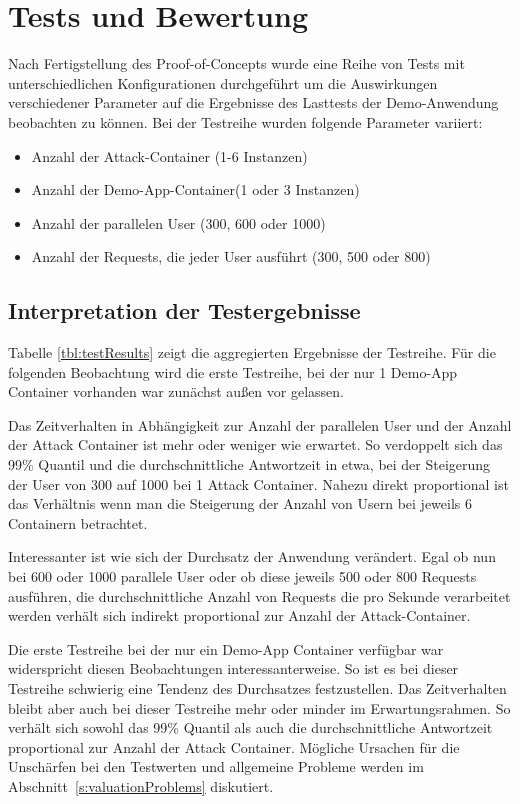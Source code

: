 \chapter{Tests und Bewertung}

Nach Fertigstellung des Proof-of-Concepts wurde eine Reihe von Tests mit unterschiedlichen Konfigurationen durchgef\"uhrt um die Auswirkungen verschiedener Parameter auf die Ergebnisse des Lasttests der Demo-Anwendung beobachten zu k\"onnen.
Bei der Testreihe wurden folgende Parameter variiert:

\begin{itemize}
	\item Anzahl der Attack-Container (1-6 Instanzen)
	\item Anzahl der Demo-App-Container(1 oder 3 Instanzen)
	\item Anzahl der parallelen User (300, 600 oder 1000)
	\item Anzahl der Requests, die jeder User ausf\"uhrt (300, 500 oder 800)
\end{itemize}

\section{Interpretation der Testergebnisse}
\label{s:valuationInterpretation}

Tabelle \ref{tbl:testResults} zeigt die aggregierten Ergebnisse der Testreihe.
F\"ur die folgenden Beobachtung wird die erste Testreihe, bei der nur 1 Demo-App Container vorhanden war zun\"achst au\ss{}en vor gelassen.

Das Zeitverhalten in Abh\"angigkeit zur Anzahl der parallelen User und der Anzahl der Attack Container ist mehr oder weniger wie erwartet.
So verdoppelt sich das 99\% Quantil und die durchschnittliche Antwortzeit in etwa, bei der Steigerung der User von 300 auf 1000 bei 1 Attack Container.
Nahezu direkt proportional ist das Verh\"altnis wenn man die Steigerung der Anzahl von Usern bei jeweils 6 Containern betrachtet.

Interessanter ist wie sich der Durchsatz der Anwendung ver\"andert.
Egal ob nun bei 600 oder 1000 parallele User oder ob diese jeweils 500 oder 800 Requests ausf\"uhren, die durchschnittliche Anzahl von Requests die pro Sekunde verarbeitet werden verh\"alt sich indirekt proportional zur Anzahl der Attack-Container.

Die erste Testreihe bei der nur ein Demo-App Container verf\"ugbar war widerspricht diesen Beobachtungen interessanterweise.
So ist es bei dieser Testreihe schwierig eine Tendenz des Durchsatzes festzustellen.
Das Zeitverhalten bleibt aber auch bei dieser Testreihe mehr oder minder im Erwartungsrahmen.
So verh\"alt sich sowohl das 99\% Quantil als auch die durchschnittliche Antwortzeit proportional zur Anzahl der Attack Container.
M\"ogliche Ursachen f\"ur die Unsch\"arfen bei den Testwerten und allgemeine Probleme werden im Abschnitt~\ref{s:valuationProblems} diskutiert.

